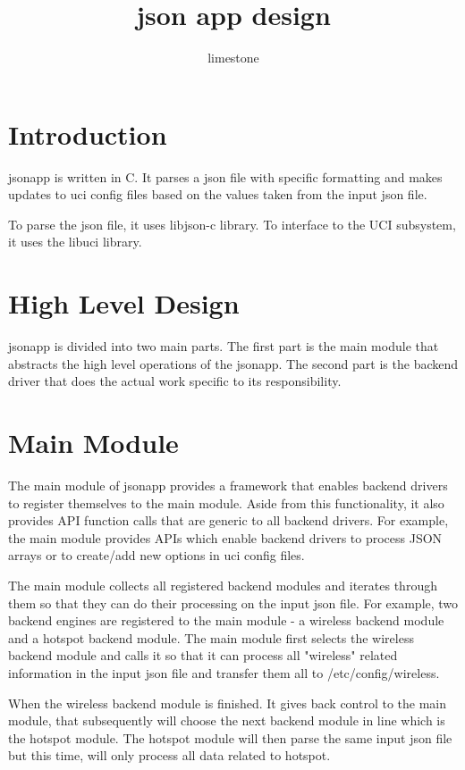 \documentclass{article}
\title{json app design}
\author{limestone}
\begin{document}
\maketitle

\section{Introduction}

jsonapp is written in C. It parses a json file with specific formatting and makes updates to uci config files based on the values taken from the input json file.

To parse the json file, it uses libjson-c library. To interface to the UCI subsystem, it uses the libuci library.

\section{High Level Design}
jsonapp is divided into two main parts. The first part is the main module that abstracts the high level operations of the jsonapp. The second part is the backend driver that does the actual work specific to its responsibility.

\section{Main Module}
The main module of jsonapp provides a framework that enables backend drivers to register themselves to the main module. Aside from this functionality, it also provides API function calls that are generic to all backend drivers. For example, the main module provides APIs which enable backend drivers to process JSON arrays or to create/add new options in uci config files.

The main module collects all registered backend modules and iterates through them so that they can do their processing on the input json file. For example, two backend engines are registered to the main module - a wireless backend module and a hotspot backend module. The main module first selects the wireless backend module and calls it so that it can process all "wireless" related information in the input json file and transfer them all to /etc/config/wireless.

When the wireless backend module is finished. It gives back control to the main module, that subsequently will choose the next backend module in line which is the hotspot module. The hotspot module will then parse the same input json file but this time, will only process all data related to hotspot.
\end{document}
